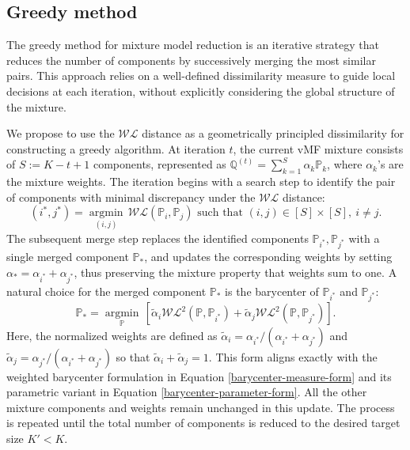 \documentclass[10pt]{article}
\DeclareMathOperator*{\argmin}{argmin}
\newcommand{\bbP}{\mathbb{P}}
\newcommand{\bbQ}{\mathbb{Q}}
\newcommand{\WL}{\mathcal{WL}}
\begin{document}
\subsection{Greedy method}

The greedy method for mixture model reduction is an iterative strategy that reduces the number of components by successively merging the most similar pairs. This approach relies on a well-defined dissimilarity measure to guide local decisions at each iteration, without explicitly considering the global structure of the mixture.


We propose to use the $\WL$ distance as a geometrically principled dissimilarity for constructing a greedy algorithm. At iteration $t$, the current vMF mixture consists of $S:=K-t+1$ components, represented as  $\bbQ^{(t)} = \sum_{k=1}^S \alpha_k \bbP_k$,
where $\alpha_k$'s are the mixture weights. The iteration begins with a \textsf{search} step to identify the pair of components with minimal discrepancy under the $\WL$ distance: 
\begin{equation}\label{eq-minimizing-index-distance}
	(i^*, j^*) = \underset{(i,j)}{\argmin} \, \WL(\bbP_i, \bbP_j) \,\, \textrm{such that } (i,j) \in [S]\times [S], ~ i\neq j.
\end{equation}
The subsequent \textsf{merge} step replaces the identified components $\bbP_{i^*}, \bbP_{j^*}$ with a single merged component $\bbP_{*}$, and updates the corresponding weights by setting $\alpha_{*} = \alpha_{i^*} + \alpha_{j^*}$, thus preserving the mixture property that weights sum to one. A natural choice for the merged component $\bbP_{*}$ is the barycenter of $\bbP_{i^*}$ and $\bbP_{j^*}$:
\begin{equation}\label{eq-barycenter-closest}
	\bbP_{*} = \underset{\bbP}{\argmin}\, \left[\tilde{\alpha}_{i} \WL^2 (\bbP, \bbP_{i^*}) 
	+
	\tilde{\alpha}_{j} \WL^2 (\bbP, \bbP_{j^*})
	\right].
\end{equation} 
Here, the normalized weights are defined as $\tilde{\alpha}_i = \alpha_{i^*}/(\alpha_{i^*} + \alpha_{j^*})$ and $\tilde{\alpha}_j = \alpha_{j^*}/(\alpha_{i^*} + \alpha_{j^*})$ so that $\tilde{\alpha}_i + \tilde{\alpha}_j = 1$. This form aligns exactly with the weighted barycenter formulation in Equation \eqref{barycenter-measure-form} and its parametric variant in Equation \eqref{barycenter-parameter-form}. All the other mixture components and weights remain unchanged in this update. The process is repeated until the total number of components is reduced to the desired target size $K' < K$.
\end{document}
